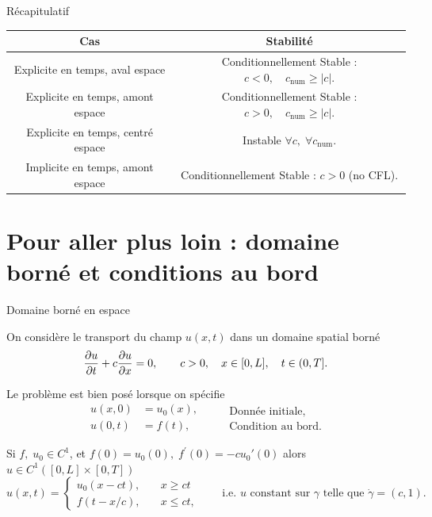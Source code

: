 \documentclass[aspectratio=169, french]{beamer}
\begin{document}
\begin{frame}{Récapitulatif}
\begin{tabular}{c|c}
	\hline
Cas	&  Stabilité \\
	\hline
Explicite en temps, aval espace	& Conditionnellement Stable : $c<0, \quad c_{\text{num}} \ge |c|$.   \\
Explicite en temps, amont espace & Conditionnellement Stable : $c>0, \quad c_{\text{num}} \ge |c|$.  \\
Explicite en temps, centré espace &  Instable $\forall c, \; \forall c_{\text{num}}$. \\
Implicite en temps, amont espace & Conditionnellement Stable : $c>0$ (no CFL). \\
	\hline
\end{tabular}
\end{frame}

\section{Pour aller plus loin : domaine borné et conditions au bord}

\begin{frame}{Domaine borné en espace}
	
On considère le transport du champ $u(x, t)$ dans un domaine spatial borné
\begin{equation*}
	\diffp{u}{t} + c \diffp{u}{x} = 0, \qquad c > 0, \quad  x \in [0, L], \quad t \in (0, T]. 
\end{equation*}
		
		Le problème est bien posé lorsque on spécifie 
		\begin{equation*}
			\begin{aligned}
			u(x, 0) &= u_0(x),\\
			u(0, t) &= f(t),
			\end{aligned} \qquad
			\begin{aligned}
			\text{Donnée initiale}, \\
			\text{Condition au bord}.
			\end{aligned}
		\end{equation*}
	\begin{tcolorbox}[title = Solution analytique, coltitle=white]
Si $f, \; u_0 \in C^{1}$, et $f(0) = u_0(0), \; f^{'}(0) = -c u_0{'}(0)$
alors  $u \in C^{1}([0, L]\times [0, T])$ 
\begin{equation*}
	u(x, t) = \begin{cases}
		u_0(x - ct), \quad &x\ge ct\\
		f(t-x/c), \quad &x\le ct,
	\end{cases}
	\qquad\text{i.e. $u$ constant sur $\gamma$ telle que $\dot{\gamma} = (c ,1)$.}
\end{equation*}
\end{tcolorbox}
	
\end{frame}
\end{document}
